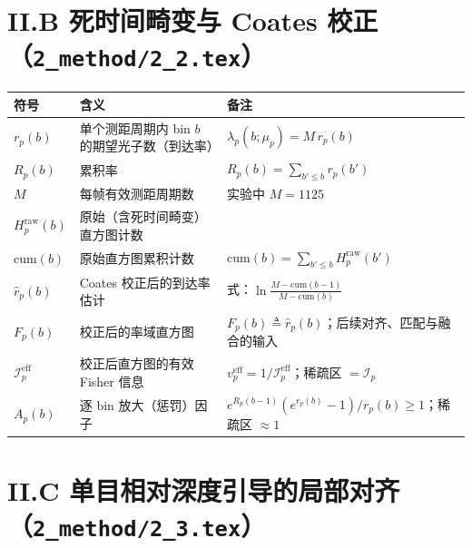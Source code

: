 \documentclass[11pt]{ctexart}
\begin{document}
\section*{II.B 死时间畸变与 Coates 校正（\texttt{2\_method/2\_2.tex}）}

\begin{center}
\begin{tabular}{@{}llp{}@{}}
\toprule
符号 & 含义 & 备注 \\
\midrule
$r_p(b)$ & 单个测距周期内 bin $b$ 的期望光子数（到达率） & $\lambda_p(b;\mu_p)=M\,r_p(b)$ \\
$R_p(b)$ & 累积率 & $R_p(b)=\sum_{b'\le b}r_p(b')$ \\
$M$ & 每帧有效测距周期数 & 实验中 $M=1125$ \\
$H_p^{\mathrm{raw}}(b)$ & 原始（含死时间畸变）直方图计数 & \\
$\mathrm{cum}(b)$ & 原始直方图累积计数 & $\mathrm{cum}(b)=\sum_{b'\le b}H_p^{\mathrm{raw}}(b')$ \\
$\hat r_p(b)$ & Coates 校正后的到达率估计 & 式：$\ln\frac{M-\mathrm{cum}(b-1)}{M-\mathrm{cum}(b)}$ \\
$F_p(b)$ & 校正后的率域直方图 & $F_p(b)\triangleq\hat r_p(b)$；后续对齐、匹配与融合的输入 \\
$\mathcal I_p^{\mathrm{eff}}$ & 校正后直方图的有效 Fisher 信息 & $v_p^{\mathrm{eff}}=1/\mathcal I_p^{\mathrm{eff}}$；稀疏区 $=\mathcal I_p$ \\
$A_p(b)$ & 逐 bin 放大（惩罚）因子 & $e^{R_p(b-1)}(e^{r_p(b)}-1)/r_p(b)\ge1$；稀疏区 $\approx1$ \\
\bottomrule
\end{tabular}
\end{center}

\section*{II.C 单目相对深度引导的局部对齐（\texttt{2\_method/2\_3.tex}）}
\end{document}
